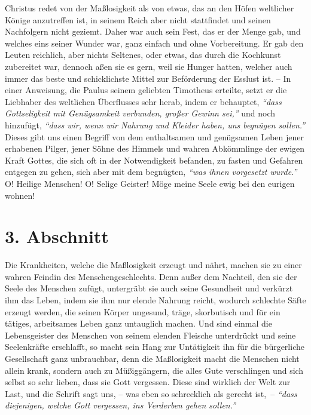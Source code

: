 \medskip

Christus redet von der Maßlosigkeit als von
etwas, das an den Höfen weltlicher
Könige anzutreffen ist, in seinem Reich aber nicht stattfindet und seinen
Nachfolgern nicht geziemt. Daher war auch sein Fest, das er der Menge gab, und
welches eins seiner Wunder war, ganz einfach und ohne Vorbereitung. Er gab den
Leuten reichlich, aber nichts Seltenes, oder etwas, das durch die
Kochkunst
zubereitet war, dennoch aßen sie es gern, weil sie Hunger hatten, welcher auch
immer das beste und schicklichste Mittel zur Beförderung der Esslust ist. -- In
einer Anweisung, die Paulus seinem geliebten Timotheus erteilte, setzt er die
Liebhaber des weltlichen Überflusses sehr herab, indem er behauptet,
\textit{"`dass Gottseligkeit mit Genügsamkeit verbunden, großer Gewinn sei,"'}
und noch
hinzufügt, \textit{"`dass wir, wenn wir Nahrung und Kleider haben, uns begnügen
sollen."'}
Dieses gibt uns einen Begriff von dem
enthaltsamen und genügsamen Leben jener erhabenen
Pilger, jener
Söhne des Himmels und wahren Abkömmlinge der
ewigen Kraft
Gottes, die sich oft in der
Notwendigkeit befanden, zu fasten und Gefahren entgegen zu gehen,
sich aber
mit dem begnügten, \textit{"`was ihnen vorgesetzt wurde."'} O! Heilige Menschen!
O!
Selige Geister! Möge meine Seele ewig bei den eurigen wohnen!

\section{3. Abschnitt} \label{kap14_ab3}

Die Krankheiten, welche die Maßlosigkeit erzeugt
und nährt, machen sie zu einer
wahren Feindin des Menschengeschlechts. Denn außer dem Nachteil, den sie der
Seele des Menschen zufügt, untergräbt sie auch seine
Gesundheit und verkürzt ihm
das Leben, indem sie ihm nur elende Nahrung reicht, wodurch schlechte Säfte
erzeugt werden, die seinen Körper ungesund, träge,
skorbutisch und
für ein tätiges,
arbeitsames Leben ganz untauglich machen. Und sind
einmal die Lebensgeister des
Menschen von seinem elenden Fleische unterdrückt und seine Seelenkräfte
erschlafft, so macht sein Hang zur Untätigkeit ihn für die
bürgerliche Gesellschaft
 ganz unbrauchbar,
denn die Maßlosigkeit
macht die Menschen nicht
allein krank, sondern auch zu Müßiggängern, die alles Gute
verschlingen und
sich selbst so sehr lieben, dass sie Gott vergessen. Diese sind wirklich der
Welt
zur Last, und die Schrift sagt uns, -- was eben so
schrecklich als gerecht ist,~-- \textit{"`dass diejenigen, welche Gott vergessen, ins Verderben gehen
sollen."'}

